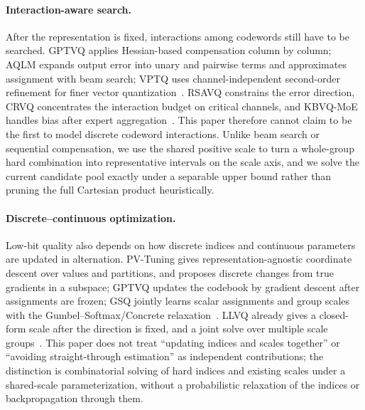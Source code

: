 \paragraph{Interaction-aware search.}
After the representation is fixed, interactions among codewords still have to be searched.
GPTVQ applies Hessian-based compensation column by column; AQLM expands output error into unary and pairwise terms and approximates assignment with beam search; VPTQ uses channel-independent second-order refinement for finer vector quantization~\cite{gptvq,aqlm,vptq}.
RSAVQ constrains the error direction, CRVQ concentrates the interaction budget on critical channels, and KBVQ-MoE handles bias after expert aggregation~\cite{rsavq,crvq,kbvqmoe}.
This paper therefore cannot claim to be the first to model discrete codeword interactions.
Unlike beam search or sequential compensation, we use the shared positive scale to turn a whole-group hard combination into representative intervals on the scale axis, and we solve the current candidate pool exactly under a separable upper bound rather than pruning the full Cartesian product heuristically.

\paragraph{Discrete--continuous optimization.}
Low-bit quality also depends on how discrete indices and continuous parameters are updated in alternation.
PV-Tuning gives representation-agnostic coordinate descent over values and partitions, and proposes discrete changes from true gradients in a subspace; GPTVQ updates the codebook by gradient descent after assignments are frozen; GSQ jointly learns scalar assignments and group scales with the Gumbel--Softmax/Concrete relaxation~\cite{pvtuning,gptvq,gsq,gumbel,concrete}.
LLVQ already gives a closed-form scale after the direction is fixed, and a joint solve over multiple scale groups~\cite{llvq}.
This paper does not treat ``updating indices and scales together'' or ``avoiding straight-through estimation'' as independent contributions; the distinction is combinatorial solving of hard indices and existing scales under a shared-scale parameterization, without a probabilistic relaxation of the indices or backpropagation through them.

